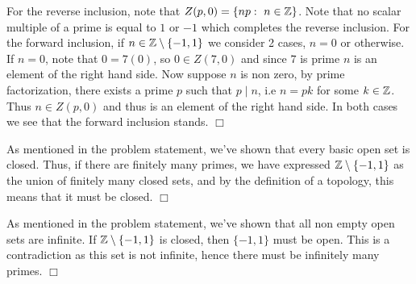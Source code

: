 \documentclass{article}
\begin{document}
 {
    \begin{spacedenumerate}
        \item For the reverse inclusion, note that $Z(p,0) = \{np:\ n\in \mathbb{Z}\}$. Note that no scalar multiple of a prime is equal to $1$ or $-1$ which completes the reverse inclusion. For the forward inclusion, if $n\in \mathbb{Z}\setminus\{-1,1\}$ we consider 2 cases, $n = 0$ or otherwise. If $n = 0$, note that $0 = 7(0)$, so $0\in Z(7,0)$ and since $7$ is prime $n$ is an element of the right hand side. Now suppose $n$ is non zero, by prime factorization, there exists a prime $p$ such that $p\mid n$, i.e $n = pk$ for some $k\in \mathbb{Z}$. Thus $n\in Z(p,0)$ and thus is an element of the right hand side. In both cases we see that the forward inclusion stands. $\Box$
        \item As mentioned in the problem statement, we've shown that every basic open set is closed. Thus, if there are finitely many primes, we have expressed $\mathbb{Z}\setminus\{-1,1\}$ as the union of finitely many closed sets, and by the definition of a topology, this means that it must be closed. $\Box$
        \item As mentioned in the problem statement, we've shown that all non empty open sets are infinite. If $\mathbb{Z}\setminus\{-1,1\}$ is closed, then $\{-1, 1\}$ must be open. This is a contradiction as this set is not infinite, hence there must be infinitely many primes. $\Box$
    \end{spacedenumerate}
}
\end{document}
